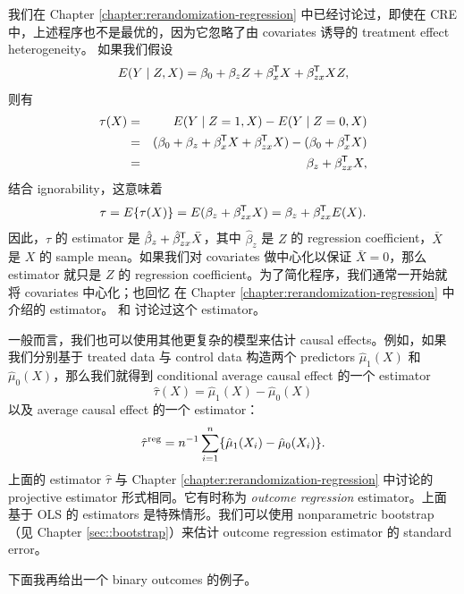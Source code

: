  
 
我们在 Chapter \ref{chapter:rerandomization-regression} 中已经讨论过，即使在 CRE 中，上述程序也不是最优的，因为它忽略了由 covariates 诱导的 treatment effect heterogeneity。
如果我们假设
$$
E(Y\mid Z, X) = \beta_0 + \beta_z Z  + \beta_x^{\mkern-1.5mu\mathsf{T}}  X  + \beta_{zx}^{\mkern-1.5mu\mathsf{T}}  X Z,
$$
则有
\begin{eqnarray*}
\tau(X) &=& 
E(Y\mid Z=1, X) - E(Y\mid Z=0, X)  \\
&=& (\beta_0 + \beta_z   + \beta_x^{\mkern-1.5mu\mathsf{T}}  X +\beta_{zx}^{\mkern-1.5mu\mathsf{T}}  X ) - ( \beta_0    + \beta_x^{\mkern-1.5mu\mathsf{T}}  X ) \\
&=& \beta_z+  \beta_{zx}^{\mkern-1.5mu\mathsf{T}}  X,
\end{eqnarray*}
结合 ignorability，这意味着
$$
\tau = E\{ \tau(X)  \} =E(\beta_z+  \beta_{zx}^{\mkern-1.5mu\mathsf{T}}  X) = \beta_z + \beta_{zx}^{\mkern-1.5mu\mathsf{T}} E(X). 
$$
因此，$\tau$ 的 estimator 是 $ \hat{\beta}_z + \hat{\beta}_{zx}^{\mkern-1.5mu\mathsf{T}}  \bar{X}$，其中 $\hat{\beta}_z$ 是 $Z$ 的 regression coefficient，$\bar{X}$ 是 $X$ 的 sample mean。如果我们对 covariates 做中心化以保证 $\bar{X}=0$，那么 estimator 就只是 $Z$ 的 regression coefficient。为了简化程序，我们通常一开始就将 covariates 中心化；也回忆 \citet{lin2013} 在 Chapter \ref{chapter:rerandomization-regression} 中介绍的 estimator。\citet{rosenbaum1983central} 和 \citet{hirano2001estimation} 讨论过这个 estimator。 



一般而言，我们也可以使用其他更复杂的模型来估计 causal effects。例如，如果我们分别基于 treated data 与 control data 构造两个 predictors $\hat{\mu}_1(X)$ 和 $\hat{\mu}_0(X)$，那么我们就得到 conditional average causal effect 的一个 estimator
$$
\hat\tau(X) = \hat{\mu}_1(X) - \hat{\mu}_0(X)
$$
以及 average causal effect 的一个 estimator：
$$
\hat{\tau}^{\text{reg}} = n^{-1} \sum_{i=1}^n \{ \hat{\mu}_1(X_i) - \hat{\mu}_0(X_i) \}  . 
$$
上面的 estimator $\hat{\tau} $ 与 Chapter \ref{chapter:rerandomization-regression} 中讨论的 projective estimator 形式相同。它有时称为 {\it outcome regression} estimator。上面基于 OLS 的 estimators 是特殊情形。我们可以使用 nonparametric bootstrap（见 Chapter \ref{sec::bootstrap}）来估计 outcome regression estimator 的 standard error。 


下面我再给出一个 binary outcomes 的例子。 

